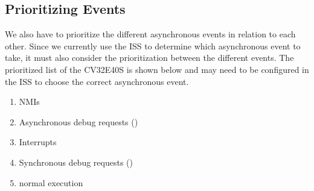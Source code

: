\subsection{Prioritizing Events}

We also have to prioritize the different asynchronous events in relation to each other. Since we currently use the ISS to determine which asynchronous event to take, it must also consider the prioritization between the different events. The prioritized list of the CV32E40S \cite{openhwgroupCv32e40s2024} is shown below and may need to be configured in the ISS to choose the correct asynchronous event.

\begin{enumerate}
    \item NMIs
    \item Asynchronous debug requests ()
    \item Interrupts
    \item Synchronous debug requests ()
    \item normal execution
\end{enumerate}



%
%
%
%
%
%
%
%
%
%
%
%
%


